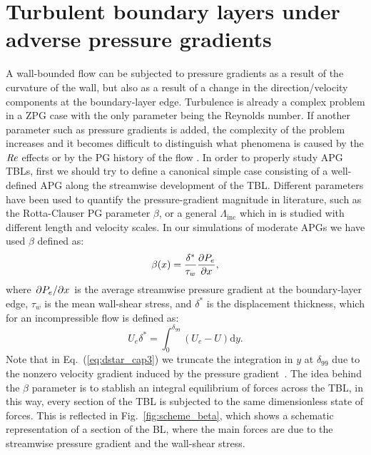 
\section{Turbulent boundary layers under adverse pressure gradients}

A wall-bounded flow can be subjected to pressure gradients as a result of the curvature of the wall, but also as a result of a change in the direction/velocity components at the boundary-layer edge.
Turbulence is already a complex problem in a ZPG case with the only parameter being the Reynolds number. If another parameter such as pressure gradients is added, the complexity of the problem increases and it becomes difficult to distinguish what phenomena is caused by the $\mbox{\textit{Re}}$ effects or by the PG history of the flow \citep{bobke2017}.
In order to properly study APG TBLs, first we should try to define a canonical simple case consisting of a well-defined APG along the streamwise development of the TBL. 
Different parameters have been used to quantify the pressure-gradient magnitude in literature, such as the Rotta-Clauser PG parameter $\beta$, or a general $\Lambda_{\mathrm{inc}}$ which in \cite{Gibis2019} is studied with different length and velocity scales.
In our simulations of moderate APGs we have used $\beta$ defined as:
\begin{equation}
    \beta(x) = \frac{\delta^*}{\tau_w} \pdv{P_e}{x},
\end{equation}
where $\pdv{P_e}/{x}$ is the average streamwise pressure gradient at the boundary-layer edge, $\tau_w$ is the mean wall-shear stress, and $\delta^*$ is the displacement thickness, which for an incompressible flow is defined as:
\begin{equation}
    \label{eq:dstar_cap3}
    U_e \delta^* = \int_{0}^{\delta_{99}} (U_e - U) \mathrm{d}y.
\end{equation}
Note that in Eq.~(\ref{eq:dstar_cap3}) we truncate the integration in $y$ at $\delta_{99}$ due to the nonzero velocity gradient induced by the pressure gradient~\citep{diagnostic_Vinuesa}. The idea behind the $\beta$ parameter is to stablish an integral equilibrium of forces across the TBL, in this way, every section of the TBL is subjected to the same dimensionless state of forces.
This is reflected in Fig.~\ref{fig:scheme_beta}, which shows a schematic representation  of a section of the BL, where the main forces are due to the streamwise pressure gradient and the wall-shear stress.

